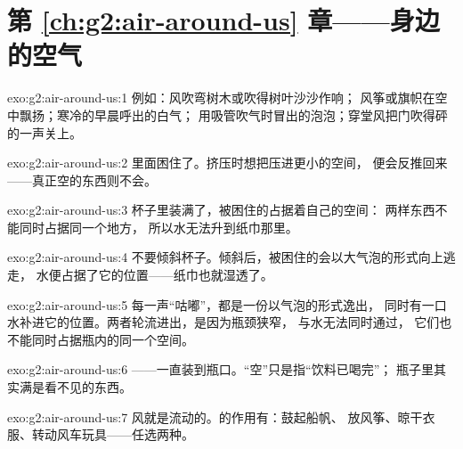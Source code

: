 \section*{第 \ref{ch:g2:air-around-us} 章——身边的空气}

\begin{solution}{exo:g2:air-around-us:1}
例如：风吹弯树木或吹得树叶沙沙作响；
风筝或旗帜在空中飘扬；寒冷的早晨呼出的白气；
用吸管吹气时冒出的泡泡；穿堂风把门吹得砰的一声关上。
\end{solution}

\begin{solution}{exo:g2:air-around-us:2}
里面困住了。挤压时想把压进更小的空间，
便会反推回来——真正空的东西则不会。
\end{solution}

\begin{solution}{exo:g2:air-around-us:3}
杯子里装满了，被困住的占据着自己的空间：
两样东西不能同时占据同一个地方，
所以水无法升到纸巾那里。
\end{solution}

\begin{solution}{exo:g2:air-around-us:4}
不要倾斜杯子。倾斜后，被困住的会以大气泡的形式向上逃走，
水便占据了它的位置——纸巾也就湿透了。
\end{solution}

\begin{solution}{exo:g2:air-around-us:5}
每一声“咕嘟”，都是一份以气泡的形式逸出，
同时有一口水补进它的位置。两者轮流进出，是因为瓶颈狭窄，
与水无法同时通过，
它们也不能同时占据瓶内的同一个空间。
\end{solution}

\begin{solution}{exo:g2:air-around-us:6}
——一直装到瓶口。“空”只是指“饮料已喝完”；
瓶子里其实满是看不见的东西。
\end{solution}

\begin{solution}{exo:g2:air-around-us:7}
风就是流动的。的作用有：鼓起船帆、
放风筝、晾干衣服、转动风车玩具——任选两种。
\end{solution}

